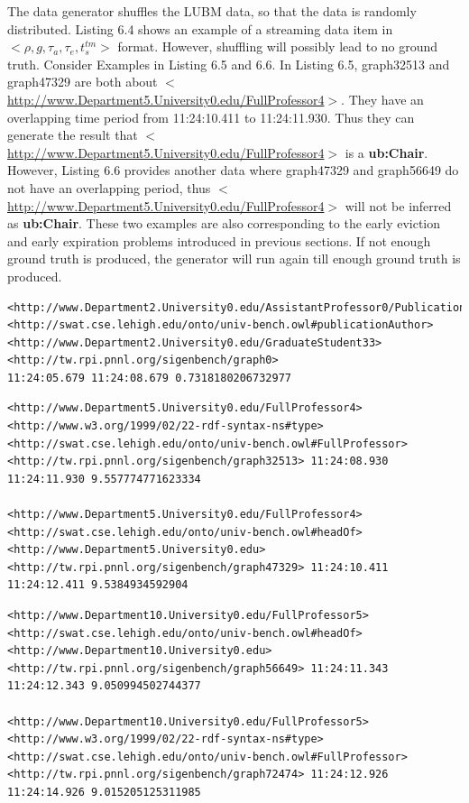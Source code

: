 The data generator shuffles the LUBM data, so that the data is randomly distributed.
Listing 6.4 shows an example of a streaming data item in $<\rho, g, \tau_{a}, \tau_{e}, t^{tm}_{s}>$ format.
However, shuffling will possibly lead to no ground truth. 
Consider Examples in Listing 6.5 and 6.6. 
In Listing 6.5, graph32513 and graph47329 are both about $<$\url{http://www.Department5.University0.edu/FullProfessor4}$>$. 
They have an overlapping time period from 11:24:10.411 to 11:24:11.930.
Thus they can generate the result that $<$\url{http://www.Department5.University0.edu/FullProfessor4}$>$ is a \textbf{ub:Chair}.
However, Listing 6.6 provides another data where graph47329 and graph56649 do not have an overlapping period, thus $<$\url{http://www.Department5.University0.edu/FullProfessor4}$>$ will not be inferred as \textbf{ub:Chair}.
These two examples are also corresponding to the early eviction and early expiration problems introduced in previous sections. 
If not enough ground truth is produced, the generator will run again till enough ground truth is produced.

\begin{lstlisting}[caption={Generated RDF Stream Example 1},basicstyle=\tiny,frame=single]
<http://www.Department2.University0.edu/AssistantProfessor0/Publication7> 
<http://swat.cse.lehigh.edu/onto/univ-bench.owl#publicationAuthor>
<http://www.Department2.University0.edu/GraduateStudent33> 
<http://tw.rpi.pnnl.org/sigenbench/graph0> 
11:24:05.679 11:24:08.679 0.7318180206732977
\end{lstlisting}

\begin{lstlisting}[caption={Generated RDF Stream Example 2},basicstyle=\tiny,frame=single]
<http://www.Department5.University0.edu/FullProfessor4>
<http://www.w3.org/1999/02/22-rdf-syntax-ns#type>
<http://swat.cse.lehigh.edu/onto/univ-bench.owl#FullProfessor>
<http://tw.rpi.pnnl.org/sigenbench/graph32513> 11:24:08.930 11:24:11.930 9.557774771623334

<http://www.Department5.University0.edu/FullProfessor4>
<http://swat.cse.lehigh.edu/onto/univ-bench.owl#headOf>
<http://www.Department5.University0.edu>
<http://tw.rpi.pnnl.org/sigenbench/graph47329> 11:24:10.411 11:24:12.411 9.5384934592904
\end{lstlisting}

\begin{lstlisting}[caption={Generated RDF Stream Example 3},basicstyle=\tiny,frame=single]
<http://www.Department10.University0.edu/FullProfessor5>
<http://swat.cse.lehigh.edu/onto/univ-bench.owl#headOf>
<http://www.Department10.University0.edu>
<http://tw.rpi.pnnl.org/sigenbench/graph56649> 11:24:11.343 11:24:12.343 9.050994502744377

<http://www.Department10.University0.edu/FullProfessor5>
<http://www.w3.org/1999/02/22-rdf-syntax-ns#type>
<http://swat.cse.lehigh.edu/onto/univ-bench.owl#FullProfessor>
<http://tw.rpi.pnnl.org/sigenbench/graph72474> 11:24:12.926 11:24:14.926 9.015205125311985
\end{lstlisting}
%
